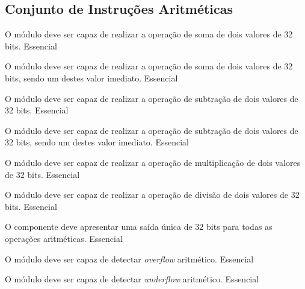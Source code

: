 \subsection{Conjunto de Instruções Aritméticas} 
  
    \begin{functional}
      {O módulo deve ser capaz de realizar a operação de soma de dois valores de 32 bits.}
      {Essencial}
      
      {O módulo deve ser capaz de realizar a operação de soma de dois valores de 32 bits, sendo um destes valor imediato.}
      {Essencial}

      {O módulo deve ser capaz de realizar a operação de subtração de dois valores de 32 bits.}
      {Essencial}
      
      {O módulo deve ser capaz de realizar a operação de subtração de dois valores de 32 bits, sendo um destes valor imediato.}
      {Essencial}

      {O módulo deve ser capaz de realizar a operação de multiplicação de dois valores de 32 bits. }
      {Essencial}

      {O módulo deve ser capaz de realizar a operação de divisão de dois valores de 32 bits.}
      {Essencial} 
     

      {O componente deve apresentar uma saída única de 32 bits para todas as operações aritméticas.}
      {Essencial}       

      {O módulo deve ser capaz de detectar \textit{overflow} aritmético.}
      {Essencial}
      
      {O módulo deve ser capaz de detectar \textit{underflow} aritmético.}
      {Essencial}
      
      
    \end{functional}